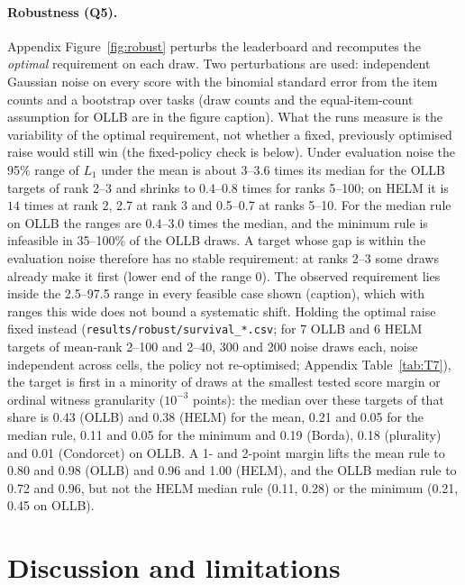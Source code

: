 \documentclass{article}
\begin{document}
\paragraph{Robustness (Q5).}
Appendix Figure~\ref{fig:robust} perturbs the leaderboard and recomputes the \emph{optimal} requirement on each draw. Two perturbations are used: independent Gaussian noise on every score with the binomial standard error from the item counts and a bootstrap over tasks (draw counts and the equal-item-count assumption for OLLB are in the figure caption). What the runs measure is the variability of the optimal requirement, not whether a fixed, previously optimised raise would still win (the fixed-policy check is below). Under evaluation noise the 95\% range of $L_1$ under the mean is about $3$--$3.6$ times its median for the OLLB targets of rank 2--3 and shrinks to 0.4--0.8 times for ranks 5--100; on HELM it is $14$ times at rank 2, 2.7 at rank 3 and 0.5--0.7 at ranks 5--10. For the median rule on OLLB the ranges are 0.4--3.0 times the median, and the minimum rule is infeasible in 35--100\% of the OLLB draws. A target whose gap is within the evaluation noise therefore has no stable requirement: at ranks 2--3 some draws already make it first (lower end of the range 0). The observed requirement lies inside the 2.5--97.5 range in every feasible case shown (caption), which with ranges this wide does not bound a systematic shift. Holding the optimal raise fixed instead (\texttt{results/robust/survival\_*.csv}; for 7 OLLB and 6 HELM targets of mean-rank 2--100 and 2--40, 300 and 200 noise draws each, noise independent across cells, the policy not re-optimised; Appendix Table~\ref{tab:T7}), the target is first in a minority of draws at the smallest tested score margin or ordinal witness granularity ($10^{-3}$ points): the median over these targets of that share is 0.43 (OLLB) and 0.38 (HELM) for the mean, 0.21 and 0.05 for the median rule, 0.11 and 0.05 for the minimum and 0.19 (Borda), 0.18 (plurality) and 0.01 (Condorcet) on OLLB. A 1- and 2-point margin lifts the mean rule to 0.80 and 0.98 (OLLB) and 0.96 and 1.00 (HELM), and the OLLB median rule to 0.72 and 0.96, but not the HELM median rule (0.11, 0.28) or the minimum (0.21, 0.45 on OLLB).

\section{Discussion and limitations}
\label{sec:disc}
\end{document}

